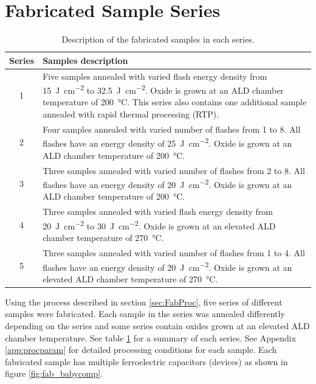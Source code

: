 \documentclass[11pt,twoside,final]{eitExjobb}  %
\begin{document}
\newpage
\section{Fabricated Sample Series}
\begin{table}[htbp]
    \centering
    \caption{Description of the fabricated samples in each series.}\label{tab:fab_series}
    \begin{tabularx}{.8\textwidth}{cX}
        \toprule
        Series & Samples description \\\midrule\vspace{.5em}
        1 &  Five samples annealed with varied flash energy density from
        \SI{15}{\joule\per\centi\meter\squared} to
        \SI{32.5}{\joule\per\centi\meter\squared}. Oxide is grown at an ALD
        chamber temperature of \SI{200}{\celsius}. This series also contains
        one additional sample annealed with rapid thermal processing (RTP).
        \\\vspace{.5em} 
        2 & Four samples annealed with varied number of flashes from 1 to 8.
        All flashes have an energy density of
        \SI{25}{\joule\per\centi\meter\squared}. Oxide is grown at an ALD chamber temperature of \SI{200}{\celsius}. \\\vspace{.5em}
        3 &  Three samples annealed with varied number of flashes from 2 to 8.
        All flashes have an energy density of
        \SI{20}{\joule\per\centi\meter\squared}. Oxide is grown at an ALD chamber temperature of \SI{200}{\celsius}. \\\vspace{.5em}
        4 &  Three samples annealed with varied flash energy density from \SI{20}{\joule\per\centi\meter\squared} to
        \SI{30}{\joule\per\centi\meter\squared}. Oxide is grown at an elevated
        ALD chamber temperature of \SI{270}{\celsius}. \\
        5 & Three samples annealed with varied number of flashes from 1 to 4.
        All flashes have an energy density of
        \SI{20}{\joule\per\centi\meter\squared}. Oxide is grown at an elevated
        ALD chamber temperature of \SI{270}{\celsius}. \\\bottomrule 
    \end{tabularx}
\end{table}

Using the process described in section \ref{sec:FabProc}, five series of
different samples were fabricated. Each sample in the series was annealed
differently depending on the series and some series contain oxides grown at an
elevated ALD chamber temperature. See table \ref{tab:fab_series} for a summary
of each series. See Appendix \ref{app:procparam} for detailed processing
conditions for each sample. Each fabricated sample has multiple ferroelectric
capacitors (devices) as shown in figure \ref{fig:fab_babycomp}.
\end{document}
